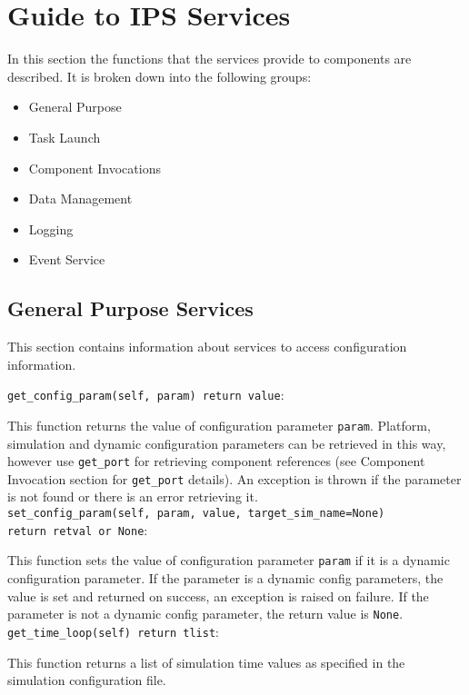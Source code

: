 \section{Guide to IPS Services}
\label{sec:services}

In this section the functions that the services provide to components are
described.  It is broken down into the following groups:
\begin{itemize}
\item General Purpose
\item Task Launch
\item Component Invocations
\item Data Management
\item Logging
\item Event Service
\end{itemize}

\subsection{General Purpose Services}
\label{sec:gen_services}
\par
This section contains information about services to access configuration information.
\par
\texttt{get\_config\_param(self, param) return value}:
\par
  This function returns the value of configuration parameter \texttt{param}.  
  Platform, simulation and dynamic configuration parameters can be 
  retrieved in this way, however use \texttt{get\_port} for retrieving component 
  references (see Component Invocation section for \texttt{get\_port} details).  
  An exception is thrown if the parameter is not found or there is an 
  error retrieving it.\\

\texttt{set\_config\_param(self, param, value, target\_sim\_name=None)\\
  return retval or None}:
\par
  This function sets the value of configuration parameter \texttt{param} if it is 
  a dynamic configuration parameter.  If the parameter is a dynamic config 
  parameters, the value is set and returned on success, an exception is 
  raised on failure.  If the parameter is not a dynamic config parameter, 
  the return value is \texttt{None}.\\

\texttt{get\_time\_loop(self) return tlist}:
\par
  This function returns a list of simulation time values as specified in 
  the simulation configuration file.\\

